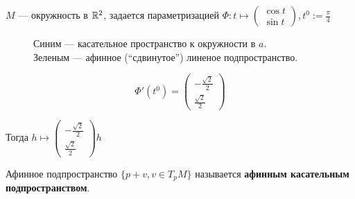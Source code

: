 \begin{example}
    $M$ --- окружность в $\mathbb{R}^2$, задается параметризацией $\Phi : t\mapsto \begin{pmatrix}
            \cos t \\
            \sin t
        \end{pmatrix}, t^0 := \frac{\pi}{4}$
    \begin{figure}[h]
        \centering
        \caption{Синим --- касательное пространство к окружности в $a$.\\ Зеленым --- афинное (``сдвинутое'') линеное подпространство.}
        \centering
    \end{figure}
    $$\Phi'(t^0) = \begin{pmatrix}
            -\frac{\sqrt{2}}{2} \\
            \frac{\sqrt{2}}{2}
        \end{pmatrix}$$

    Тогда $h \mapsto \begin{pmatrix}
            -\frac{\sqrt{2}}{2} \\
            \frac{\sqrt{2}}{2}
        \end{pmatrix} h$
\end{example}

\begin{definition}
    Афинное подпространство $\{p + v, v\in T_pM\}$ называется \textbf{афинным касательным подпространством}.
\end{definition}

